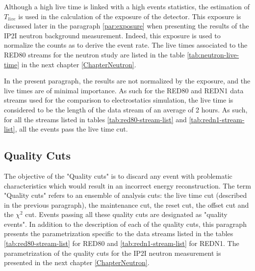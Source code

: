 Although a high live time is linked with a high events statistics, the estimation of $T_{live}$ is used in the calculation of the exposure of the detector. This exposure is discussed later in the paragraph \ref{par:exposure} when presenting the results of the IP2I neutron background measurement. Indeed, this exposure is used to normalize the counts as to derive the event rate. The live times associated to the RED80 streams for the neutron study are listed in the table \ref{tab:neutron-live-time} in the next chapter \ref{ChapterNeutron}.

In the present paragraph, the results are not normalized by the exposure, and the live times are of minimal importance. As such for the RED80 and REDN1 data streams used for the comparison to electrostatics simulation, the live time is considered to be the length of the data stream of an average of 2 hours. As such, for all the streams listed in tables \ref{tab:red80-stream-list} and \ref{tab:redn1-stream-list}, all the events pass the live time cut.


\subsection{Quality Cuts}
\label{par:quality-cuts}


The objective of the "Quality cuts" is to discard any event with problematic characteristics which would result in an incorrect energy reconstruction. The term "Quality cuts" refers to an ensemble of analysis cuts: the live time cut (described in the previous paragraph), the maintenance cut, the reset cut, the offset cut and the $\chi^2$ cut. Events passing all these quality cuts are designated as "quality events". In addition to the description of each of the quality cuts, this paragraph presents the parametrization specific to the data streams listed in the tables \ref{tab:red80-stream-list} for RED80 and \ref{tab:redn1-stream-list} for REDN1. The parametrization of the quality cuts for the IP2I neutron measurement is presented in the next chapter \ref{ChapterNeutron}.

